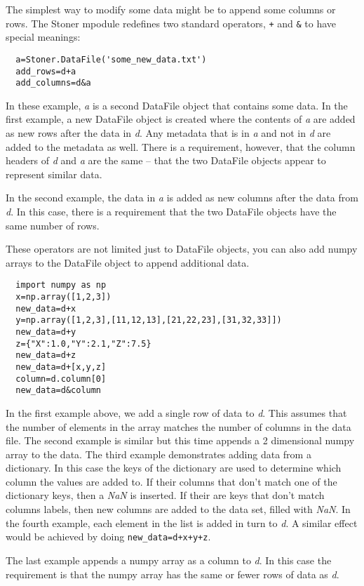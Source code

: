 \documentclass[a4paper,11pt]{scrartcl}
\begin{document}
The simplest way to modify some data might be to append some columns or rows.
The Stoner mpodule redefines two standard operators, \verb:+: and \verb:&: to
have special meanings:
\begin{lstlisting}
  a=Stoner.DataFile('some_new_data.txt')
  add_rows=d+a
  add_columns=d&a
\end{lstlisting}
In these example, \textit{a} is a second DataFile object that contains some
data. In the first example, a new DataFile object is created where the contents
of \textit{a} are added as new rows after the data in \textit{d}. Any metadata
that is in \textit{a} and not in \textit{d} are added to the metadata as well.
There is a requirement, however, that the column headers of \textit{d} and
\textit{a} are the same -- \ie that the two DataFile objects appear to represent
similar data.

In the second example, the data in \textit{a} is added as new columns after the
data from \textit{d}. In this case, there is a requirement that the two DataFile
objects have the same number of rows.

These operators are not limited just to DataFile objects, you can also add numpy
arrays to the DataFile object to append additional data.
\begin{lstlisting}
  import numpy as np
  x=np.array([1,2,3])
  new_data=d+x
  y=np.array([1,2,3],[11,12,13],[21,22,23],[31,32,33]])
  new_data=d+y
  z={"X":1.0,"Y":2.1,"Z":7.5}
  new_data=d+z
  new_data=d+[x,y,z]
  column=d.column[0]
  new_data=d&column
\end{lstlisting}
In the first example above, we add a single row of data to \textit{d}. This
assumes that the number of elements in the array matches the number of columns
in the data file. The second example is similar but this time appends a 2
dimensional numpy array to the data. The third example demonstrates adding data from a dictionary. In this case
the keys of the dictionary are used to determine which column the values are added to. If their columns that
don't match one of the dictionary keys, then a \textit{NaN} is inserted. If their are keys that don't match
columns labels, then new columns are added to the data set, filled with \textit{NaN}. In the fourth example, each element
in the list is added in turn to \textit{d}. A similar effect would be achieved by doing \verb#new_data=d+x+y+z#.

The last example appends a numpy array as
a column to \textit{d}. In this case the requirement is that the numpy array has
the same or fewer rows of data as \textit{d}.
\end{document}
